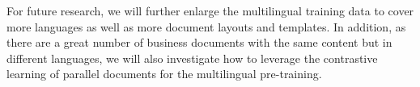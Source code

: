\documentclass[11pt]{article}
\begin{document}
For future research, we will further enlarge the multilingual training data to cover more languages as well as more document layouts and templates. In addition, as there are a great number of business documents with the same content but in different languages, we will also investigate how to leverage the contrastive learning of parallel documents for the multilingual pre-training.










































































\end{document}
